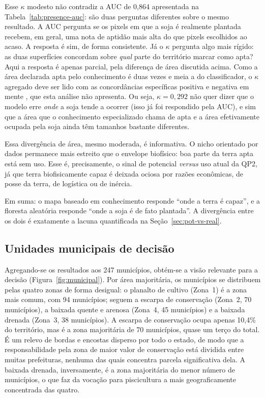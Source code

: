 Esse $\kappa$ modesto não contradiz a AUC de 0,864 apresentada na Tabela~\ref{tab:presence-auc}:
são duas perguntas diferentes sobre o mesmo resultado. A AUC pergunta se os pixels em que a soja
é realmente plantada recebem, em geral, uma nota de aptidão mais alta do que pixels escolhidos ao
acaso. A resposta é sim, de forma consistente. Já o $\kappa$ pergunta algo mais rígido: as duas
superfícies concordam sobre \emph{qual} parte do território marcar como apta? Aqui a resposta é apenas
parcial, pela diferença de área discutida acima. Como a área declarada apta pelo conhecimento é duas
vezes e meia a do classificador, o $\kappa$ agregado deve ser lido com as concordâncias específicas
positiva e negativa em mente \citep[pp.~551, 557]{cicchetti_high_1990}, que esta análise não apresenta.
Ou seja, $\kappa = 0{,}292$ não quer dizer que o modelo erre \emph{onde} a soja tende a ocorrer
(isso já foi respondido pela AUC), e sim que a área que o conhecimento especializado chama de apta e a
área efetivamente ocupada pela soja ainda têm tamanhos bastante diferentes.

Essa divergência de área, mesmo moderada, é informativa. O nicho orientado por dados
permanece mais estreito que o envelope biofísico: boa parte da terra apta está sem uso.
Esse é, precisamente, o sinal de potencial \emph{versus} uso atual da QP2, já que terra
biofisicamente capaz é deixada ociosa por razões econômicas, de posse da terra, de logística ou de
inércia. 

Em suma: o mapa baseado em conhecimento responde ``onde a terra é capaz'', e a floresta aleatória
responde ``onde a soja é de fato plantada''. A divergência entre os dois é exatamente a lacuna
quantificada na Seção~\ref{sec:pot-vs-real}.

\subsection{Unidades municipais de decisão}\label{sec:municipal}

Agregando-se os resultados aos 247 municípios, obtém-se a visão relevante para a decisão
(Figura~\ref{fig:municipal}). Por área majoritária, os municípios se distribuem pelas quatro zonas de
forma desigual: o planalto de cultivo (Zona~1) é a zona mais comum, com 94 municípios; seguem a escarpa
de conservação (Zona~2, 70 municípios), a baixada quente e arenosa (Zona~4, 45 municípios) e a baixada
drenada (Zona~3, 38 municípios). A escarpa de conservação ocupa apenas 10,4\% do território, mas é a
zona majoritária de 70 municípios, quase um terço do total. É um relevo de bordas e encostas disperso
por todo o estado, de modo que a responsabilidade pela zona de maior valor de conservação está dividida
entre muitas prefeituras, nenhuma das quais concentra parcela significativa dela. A baixada drenada,
inversamente, é a zona majoritária do menor número de municípios, o que faz da vocação para
piscicultura a mais geograficamente concentrada das quatro.

